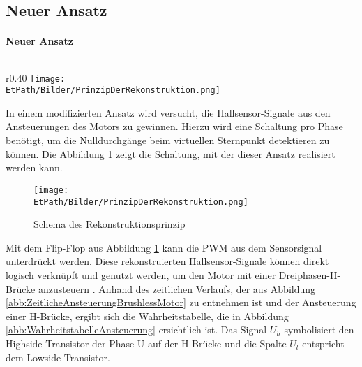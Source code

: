     \subsection{Neuer Ansatz}
    \fi
    \ifEMBED
    \paragraph{Neuer Ansatz}$~~$\vspace{2mm}\\
    \fi
        \ifEMBED
        \begin{wrapfigure}{r}{0.40\textwidth}
            \texttt{[image: \\EtPath/Bilder/PrinzipDerRekonstruktion.png]}
            \centering
            \caption[Schema des Rekonstruktionsprinzip]{Schema des Rekonstruktionsprinzip \cite{HSLU:Pluess}}
            \label{abb:PrinzipRekonstruktion}
            \end{wrapfigure}
        \fi
        In einem modifizierten Ansatz wird versucht, die Hallsensor-Signale 
        aus den Ansteuerungen des Motors zu gewinnen. Hierzu wird 
        eine Schaltung pro Phase benötigt, um die Nulldurchgänge beim 
        virtuellen Sternpunkt detektieren zu können. Die Abbildung 
        \ref{abb:PrinzipRekonstruktion} zeigt die Schaltung, mit der dieser Ansatz 
        realisiert werden kann. 
        \ifSTANDALONE
	\begin{figure}[h!]
            \centering
            \texttt{[image: \\EtPath/Bilder/PrinzipDerRekonstruktion.png]}
           	\caption{Schema des Rekonstruktionsprinzip \protect\cite{HSLU:Pluess}}
            \label{abb:PrinzipRekonstruktion}
        \end{figure}
        \fi
        Mit dem Flip-Flop aus Abbildung \ref{abb:PrinzipRekonstruktion} kann die PWM aus dem 
        Sensorsignal unterdrückt werden. Diese rekonstruierten 
        Hallsensor-Signale können direkt logisch verknüpft und genutzt 
        werden, um den Motor mit einer Dreiphasen-H-Brücke anzusteuern 
        \cite{HSLU:Pluess}. Anhand des zeitlichen Verlaufs, der aus Abbildung 
        \ref{abb:ZeitlicheAnsteuerungBrushlessMotor} zu entnehmen ist und der 
        Ansteuerung einer H-Brücke, ergibt sich die Wahrheitstabelle, die in 
        Abbildung \ref{abb:WahrheitstabelleAnsteuerung} ersichtlich ist. Das 
        Signal $U_h$ symbolisiert den Highside-Transistor der Phase U auf der 
        H-Brücke und die Spalte $U_l$ entspricht dem Lowside-Transistor.\\      
        
